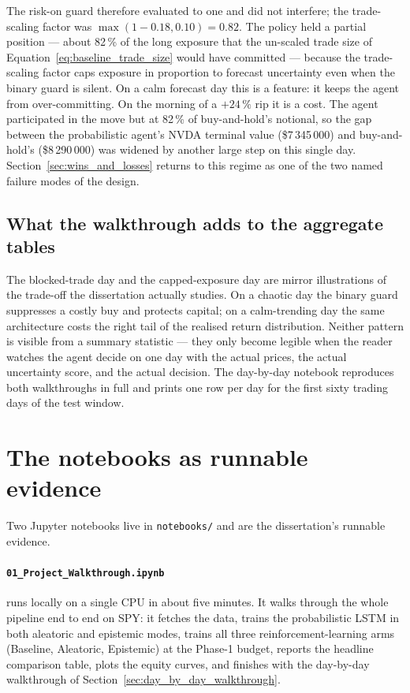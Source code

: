 The risk-on guard therefore evaluated to one and did not interfere; the trade-scaling factor was $\max(1 - 0.18, 0.10) = 0.82$. The policy held a partial position --- about 82\,\% of the long exposure that the un-scaled trade size of Equation~\ref{eq:baseline_trade_size} would have committed --- because the trade-scaling factor caps exposure in proportion to forecast uncertainty even when the binary guard is silent. On a calm forecast day this is a feature: it keeps the agent from over-committing. On the morning of a $+24\,\%$ rip it is a cost. The agent participated in the move but at 82\,\% of buy-and-hold's notional, so the gap between the probabilistic agent's NVDA terminal value (\$7\,345\,000) and buy-and-hold's (\$8\,290\,000) was widened by another large step on this single day. Section~\ref{sec:wins_and_losses} returns to this regime as one of the two named failure modes of the design.

\subsection{What the walkthrough adds to the aggregate tables}

The blocked-trade day and the capped-exposure day are mirror illustrations of the trade-off the dissertation actually studies. On a chaotic day the binary guard suppresses a costly buy and protects capital; on a calm-trending day the same architecture costs the right tail of the realised return distribution. Neither pattern is visible from a summary statistic --- they only become legible when the reader watches the agent decide on one day with the actual prices, the actual uncertainty score, and the actual decision. The day-by-day notebook reproduces both walkthroughs in full and prints one row per day for the first sixty trading days of the test window.

\section{The notebooks as runnable evidence}
\label{sec:notebooks_as_evidence}

Two Jupyter notebooks live in \texttt{notebooks/} and are the dissertation's runnable evidence.

\paragraph{\texttt{01\_Project\_Walkthrough.ipynb}} runs locally on a single CPU in about five minutes. It walks through the whole pipeline end to end on SPY: it fetches the data, trains the probabilistic LSTM in both aleatoric and epistemic modes, trains all three reinforcement-learning arms (Baseline, Aleatoric, Epistemic) at the Phase-1 budget, reports the headline comparison table, plots the equity curves, and finishes with the day-by-day walkthrough of Section~\ref{sec:day_by_day_walkthrough}.


